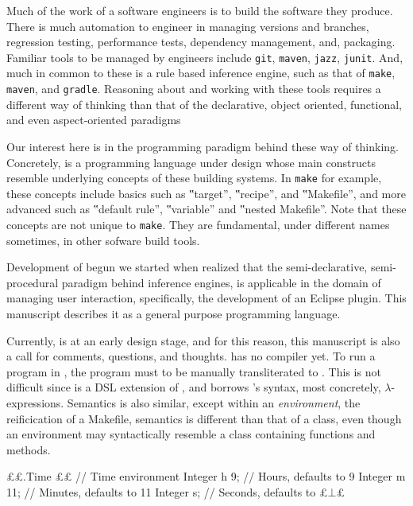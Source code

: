 \newcommand\zz[1]{\texttt{#1}}

Much of the work of a software engineers is to build the software they produce.
There is much automation to engineer in managing versions and branches,
regression testing, performance tests, dependency management, and, packaging.
Familiar tools to be managed by engineers include 
\zz{git}, \zz{maven}, \zz{jazz}, \zz{junit}. And, much in common to these is a
rule based inference engine, such as that of \zz{make}, \zz{maven}, and
\zz{gradle}. Reasoning about and working with these tools requires a different
way of thinking than that of the declarative, object oriented, functional, and
even aspect-oriented paradigms

Our interest here is in the programming paradigm behind these way of thinking.
Concretely, \Reap is a programming language under design whose main constructs
resemble underlying concepts of these building systems. In \zz{make} for
example, these concepts include basics such as ‟target”, ‟recipe”, and
‟Makefile”, and more advanced such as ‟default rule”, ‟variable” and ‟nested
Makefile”. Note that these concepts are not unique to \zz{make}. They are
fundamental, under different names sometimes, in other sofware build tools. 

Development of \Reap begun we started when realized that the semi-declarative,
semi-procedural paradigm behind inference engines, is applicable in the domain
of managing user interaction, specifically, the development of an Eclipse
plugin. This manuscript describes it as a general purpose programming language. 

Currently, \Reap is at an early design stage, and for this reason, this
manuscript is also a call for comments, questions, and thoughts. \Reap has no
compiler yet. To run a program in \Reap, the program must to be manually
transliterated to \Java. This is not difficult since \Reap is a DSL extension
of \Java, and borrows \Java's  syntax, most concretely, $λ$-expressions.
Semantics is also similar, except within an \emph{environment}, the \Reap
reificication of a Makefile, semantics is different than that of a \Java class,
even though an environment may syntactically resemble a class containing
functions and methods.

\begin{reap}
££.Time {££ // Time environment
  Integer h 9;       // Hours, defaults to 9
  Integer m 11;      // Minutes, defaults to 11
  Integer s;         // Seconds, defaults to £$⊥$£
}
\end{reap}


